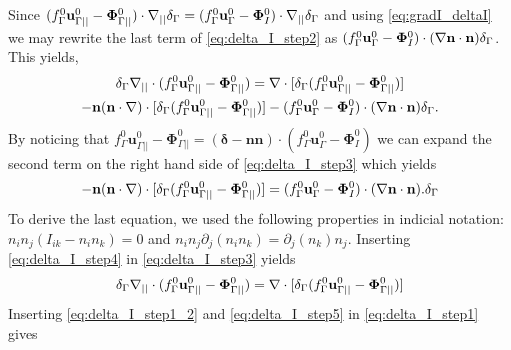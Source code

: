 Since $ (f_\Gamma^0 \textbf{u}_{\Gamma||}^0 - \mathbf{\Phi}_{\Gamma||}^0 )\cdot\mathbf{\nabla}_{||}\delta_\Gamma  = (f_\Gamma^0 \textbf{u}_\Gamma^0 - \mathbf{\Phi}_{I}^0 )\cdot\mathbf{\nabla}_{||}\delta_\Gamma$ and using \ref{eq:gradI_deltaI} we may rewrite the last term of \ref{eq:delta_I_step2} as $(f_\Gamma^0 \textbf{u}_\Gamma^0 - \mathbf{\Phi}_{I}^0 )\cdot(\mathbf{\nabla} \textbf{n}\cdot \textbf{n}) \delta_\Gamma$. This yields,
\begin{multline}
    \delta_\Gamma \divI (f_\Gamma^0 \textbf{u}_{\Gamma||}^0
    - \mathbf{\Phi}_{\Gamma||}^0 ) %
    = 
    \div [\delta_\Gamma (f_\Gamma^0 \textbf{u}_{\Gamma||}^0
    - \mathbf{\Phi}_{\Gamma||}^0 )] \\
    - \textbf{n}(\textbf{n}\cdot\grad)\cdot [\delta_\Gamma (f_\Gamma^0 \textbf{u}_{\Gamma||}^0
    - \mathbf{\Phi}_{\Gamma||}^0 )]
    - (f_\Gamma^0 \textbf{u}_\Gamma^0 - \mathbf{\Phi}_{I}^0 )\cdot(\grad \textbf{n}\cdot \textbf{n}) \delta_\Gamma.
\label{eq:delta_I_step3}
\end{multline}
By noticing that $f_\Gamma^0 \textbf{u}_{\Gamma||}^0
    - \mathbf{\Phi}_{\Gamma||}^0 = (\bm\delta - \textbf{nn})\cdot (f_\Gamma^0 \textbf{u}_\Gamma^0
    - \mathbf{\Phi}_{I}^0 )$ we can expand the second term on the right hand side of \ref{eq:delta_I_step3} which yields
\begin{equation}
    - \textbf{n}(\textbf{n}\cdot\grad)\cdot [\delta_\Gamma (f_\Gamma^0 \textbf{u}_{\Gamma||}^0
    - \mathbf{\Phi}_{\Gamma||}^0 )]
    = (f_\Gamma^0 \textbf{u}_\Gamma^0 - \mathbf{\Phi}_{I}^0 )\cdot(\grad \textbf{n}\cdot \textbf{n}). \delta_\Gamma%
\label{eq:delta_I_step4}
\end{equation}
To derive the last equation, we used the following properties in indicial notation: $n_in_j(I_{ik}-n_in_k) =0$ and $n_in_j\partial_{j}(n_in_k)=\partial_{j}(n_k)n_j$. Inserting \ref{eq:delta_I_step4} in \ref{eq:delta_I_step3} yields
\begin{equation}
    \delta_\Gamma \divI (f_\Gamma^0 \textbf{u}_{\Gamma||}^0
    - \mathbf{\Phi}_{\Gamma||}^0 ) %
    = 
    \div [\delta_\Gamma (f_\Gamma^0 \textbf{u}_{\Gamma||}^0
    - \mathbf{\Phi}_{\Gamma||}^0 )]
\label{eq:delta_I_step5}
\end{equation}
Inserting \ref{eq:delta_I_step1_2} and \ref{eq:delta_I_step5} in \ref{eq:delta_I_step1} gives


